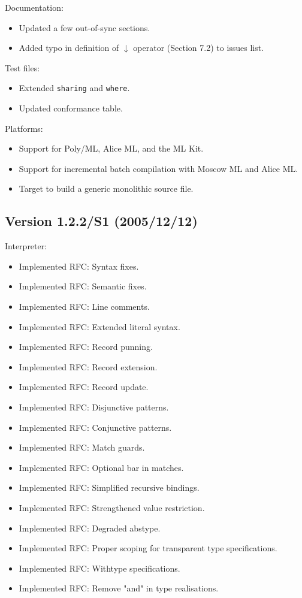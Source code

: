 \documentclass[twoside,titlepage]{article}
\begin{document}
\begin{appendix}
Documentation:
\begin{itemize} \setlength{\itemsep}{0em}
\item Updated a few out-of-sync sections.
\item Added typo in definition of $\downarrow$ operator (Section 7.2) to issues list.
\end{itemize}

Test files:
\begin{itemize} \setlength{\itemsep}{0em}
\item Extended {\tt sharing} and {\tt where}.
\item Updated conformance table.
\end{itemize}

Platforms:
\begin{itemize} \setlength{\itemsep}{0em}
\item Support for Poly/ML, Alice ML, and the ML Kit.
\item Support for incremental batch compilation with Moscow ML and Alice ML.
\item Target to build a generic monolithic source file.
\end{itemize}

\subsection*{Version 1.2.2/S1 (2005/12/12)}

Interpreter:
\begin{itemize} \setlength{\itemsep}{0em}
\item Implemented RFC: Syntax fixes.
\item Implemented RFC: Semantic fixes.
\item Implemented RFC: Line comments.
\item Implemented RFC: Extended literal syntax.
\item Implemented RFC: Record punning.
\item Implemented RFC: Record extension.
\item Implemented RFC: Record update.
\item Implemented RFC: Disjunctive patterns.
\item Implemented RFC: Conjunctive patterns.
\item Implemented RFC: Match guards.
\item Implemented RFC: Optional bar in matches.
\item Implemented RFC: Simplified recursive bindings.
\item Implemented RFC: Strengthened value restriction.
\item Implemented RFC: Degraded abstype.
\item Implemented RFC: Proper scoping for transparent type specifications.
\item Implemented RFC: Withtype specifications.
\item Implemented RFC: Remove "and" in type realisations.
\end{itemize}


\end{appendix}
\end{document}
